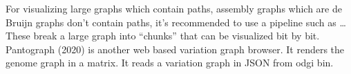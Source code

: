 \documentclass[11pt]{article}
\begin{document}
For visualizing large graphs which contain paths, assembly graphs which are de 
Bruijn graphs don’t contain paths, it’s recommended to use a pipeline such as …
These break a large graph into “chunks” that can be visualized bit by bit. 
Pantograph (2020) is another web based variation graph browser. 
It renders the genome graph in a matrix. It reads a variation graph in JSON from
odgi bin.





\end{document}
